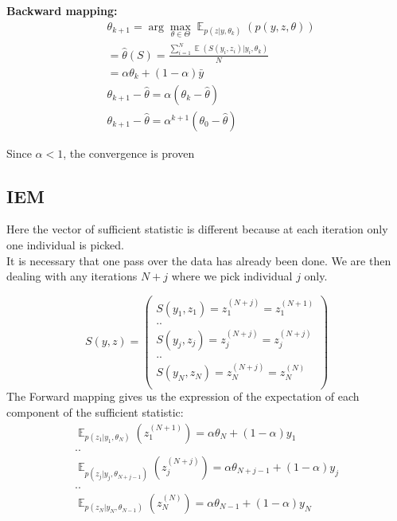 \documentclass{article}
\theoremstyle{plain}
\DeclareMathOperator*{\E}{\mathbb{E}}
\theoremstyle{plain}
\theoremstyle{definition}
\begin{document}
\noindent \textbf{Backward mapping:}
\begin{equation}
\begin{split}
& \theta_{k+1} = \arg \max \limits_{\theta \in \Theta} \E_{p(z|y,\theta_k)}(p(y,z,\theta))\\
& = \hat{\theta}(S) = \frac{\sum_{i=1}^{N}{\E{(S(y_i,z_i)|y_i,\theta_{k})}}}{N}\\
& = \alpha \theta_{k} + (1-\alpha)\bar{y}\\
& \theta_{k+1} - \hat{\theta} = \alpha (\theta_{k} - \hat{\theta})\\
& \theta_{k+1} - \hat{\theta} = \alpha^{k+1} (\theta_{0} - \hat{\theta})
\end{split}
\end{equation}

Since $\alpha < 1$, the convergence is proven

\subsection{IEM}
Here the vector of sufficient statistic is different because at each iteration only one individual is picked.\\
It is necessary that one pass over the data has already been done. We are then dealing with any iterations $N+j$ where we pick individual $j$ only.

\begin{equation}
S(y,z) = 
\left(
\begin{array}{c}
S(y_1,z_1) =z_1^{(N+j)}= z_1^{(N+1)}\\
..\\
S(y_j,z_j) =z_j^{(N+j)}= z_j^{(N+j)}\\
..\\
S(y_N,z_N) =z_N^{(N+j)}= z_N^{(N)}\\
\end{array}
\right)
\end{equation}
\noindent The Forward mapping gives us the expression of the expectation of each component of the sufficient statistic:
\begin{equation}
\begin{matrix} 
\E_{p(z_1|y_1,\theta_N)}(z_1^{(N+1)}) = \alpha \theta_{N} + (1-\alpha)y_1\\
..\\
\E_{p(z_j|y_j,\theta_{N+j-1})}(z_j^{(N+j)})= \alpha \theta_{N+j-1} + (1-\alpha)y_j\\
..\\
\E_{p(z_N|y_N,\theta_{N-1})}(z_N^{(N)}) = \alpha \theta_{N-1} + (1-\alpha)y_N
\end{matrix}
\end{equation}
\end{document}
